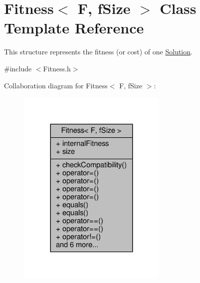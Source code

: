 \hypertarget{structFitness}{}\section{Fitness$<$ F, f\+Size $>$ Class Template Reference}
\label{structFitness}


This structure represents the fitness (or cost) of one \hyperlink{classSolution}{Solution}.  




{\ttfamily \#include $<$Fitness.\+h$>$}



Collaboration diagram for Fitness$<$ F, f\+Size $>$\+:
\nopagebreak
\begin{figure}[H]
\begin{center}
\leavevmode
\includegraphics[width=203pt]{structFitness__coll__graph}
\end{center}
\end{figure}
